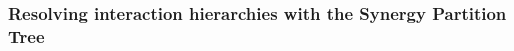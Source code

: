 \documentclass[fleqn,10pt]{wlscirep}
\theoremstyle{naturetheorem}
\begin{document}
\subsubsection*{Resolving interaction hierarchies with the Synergy Partition Tree}


\end{document}
